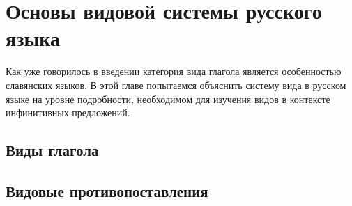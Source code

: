 \section{Основы видовой системы русского языка}

Как уже говорилось в введении категория вида глагола является особенностью славянских языков. В этой главе попытаемся объяснить систему вида в русском языке на уровне подробности, необходимом для изучения видов в контексте инфинитивных предложений.

\subsection{Виды глагола}





\subsection{Видовые противопоставления}

